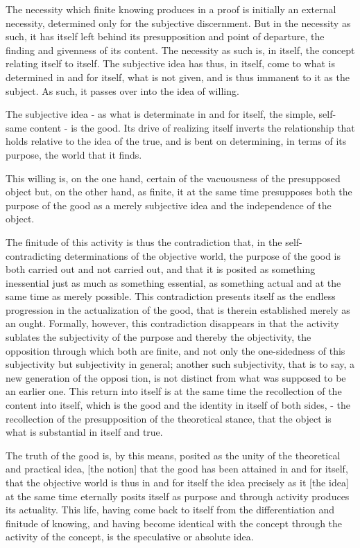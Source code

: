 The necessity which finite knowing produces in a proof
is initially an external necessity,
determined only for the subjective discernment.
But in the necessity as such, it has itself left behind its presupposition
and point of departure, the finding and givenness of its content.
The necessity as such is, in itself, the concept relating itself to itself.
The subjective idea has thus, in itself, come to what is determined in and for itself,
what is not given, and is thus immanent to it as the subject.
As such, it passes over into the idea of willing.

The subjective idea - as what is determinate in and for itself,
the simple, self-same content - is the good.
Its drive of realizing itself inverts the relationship
that holds relative to the idea of the true, and is bent on determining,
in terms of its purpose, the world that it finds.

This willing is, on the one hand, certain of the vacuousness of the presupposed object
but, on the other hand, as finite, it at the same time presupposes
both the purpose of the good as a merely subjective idea
and the independence of the object.

The finitude of this activity is thus the contradiction that, in the self-
contradicting determinations of the objective world, the purpose of the good
is both carried out and not carried out, and that it is posited as something
inessential just as much as something essential, as something actual and at
the same time as merely possible. This contradiction presents itself as the
endless progression in the actualization of the good, that is therein established
merely as an ought. Formally, however, this contradiction disappears in
that the activity sublates the subjectivity of the purpose and thereby the
objectivity, the opposition through which both are finite, and not only the
one-sidedness of this subjectivity but subjectivity in general; another such
subjectivity, that is to say, a new generation of the opposi tion, is not distinct
from what was supposed to be an earlier one. This return into itself is at
the same time the recollection of the content into itself, which
is the good and the identity in itself  of both
sides, - the recollection of the presupposition of the theoretical stance,
that the object is what is substantial in itself and true.

The truth of the good is, by this means, posited as
the unity of the theoretical and practical idea,
[the notion] that the good has been attained in and for itself,
that the objective world is thus in and for itself the idea precisely as
it [the idea] at the same time eternally posits itself as purpose and
through activity produces its actuality.
This life, having come back to itself from
the differentiation and finitude of knowing,
and having become identical with the concept
through the activity of the concept,
is the speculative or absolute idea.

